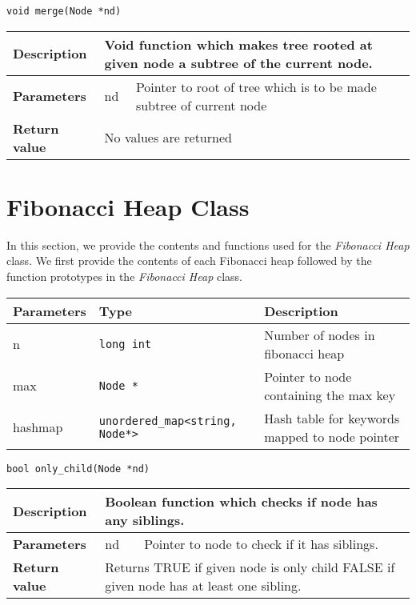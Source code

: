 \documentclass[12pt, reqno]{amsart}
\begin{document}
{\large \texttt{void merge(Node *nd)}}
\begin{center}
    \begin{tabular}{| l | p{2.5cm} | p{9.5cm} |}
    \hline
    {\bfseries Description} & \multicolumn{2}{p{12.5cm}|}{Void function which makes tree rooted at given node a subtree of the current node.} \\ \hline
    \multirow{1}{*}{\bfseries Parameters} & nd & Pointer to root of tree which is to be made subtree of current node \\ \hline
    {\bfseries Return value} & \multicolumn{2}{p{12.5cm}|}{No values are returned} \\ \hline
    \end{tabular}
\end{center}

\newpage
\section*{Fibonacci Heap Class}
In this section, we provide the contents and functions used for the \emph{Fibonacci Heap} class. We first provide the contents of each Fibonacci heap followed by the function prototypes in the \emph{Fibonacci Heap} class.

\begin{center}
    \begin{tabular}{| l | l | p{6.8cm} |}
    \hline
    {\bfseries Parameters} & {\bfseries Type} & {\bfseries Description} \\ \hline
    n & \texttt{long int} & Number of nodes in fibonacci heap \\ \hline
    max & \texttt{Node *} & Pointer to node containing the max key \\ \hline
    hashmap & \texttt{unordered\_map<string, Node*>} & Hash table for keywords mapped to node pointer \\ \hline
    \end{tabular}
\end{center}
\vspace{5mm}


{\large \texttt{bool only\_child(Node *nd)}}
\begin{center}
    \begin{tabular}{| l | p{2.5cm} | p{9.5cm} |}
    \hline
    {\bfseries Description} & \multicolumn{2}{p{12.5cm}|}{Boolean function which checks if node has any siblings.} \\ \hline
    \multirow{1}{*}{\bfseries Parameters} & nd & Pointer to node to check if it has siblings. \\ \hline
    {\bfseries Return value} & \multicolumn{2}{p{12.5cm}|}{Returns TRUE if given node is only child FALSE if given node has at least one sibling.} \\ \hline
    \end{tabular}
\end{center} 
\vspace{3mm}   
\end{document}
